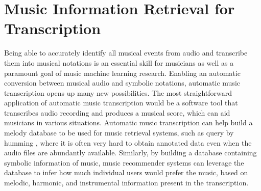 
\graphicspath{{2-mir/figures/}}

\chapter{Music Information Retrieval for Transcription}
\label{ch:mir}

Being able to accurately identify all musical events from audio and transcribe them into musical notations is an essential skill for musicians as well as a paramount goal of music machine learning research.
Enabling an automatic conversion between musical audio and symbolic notations, automatic music transcription opens up many new possibilities.
The most straightforward application of automatic music transcription would be a software tool that transcribes audio recording and produces a musical score, which can aid musicians in various situations.
Automatic music transcription can help build a melody database to be used for music retrieval systems, such as query by humming \cite{molina2014humming}, where it is often very hard to obtain annotated data even when the audio files are abundantly available.
Similarly, by building a database containing symbolic information of music, music recommender systems can leverage the database to infer how much individual users would prefer the music, based on melodic, harmonic, and instrumental information present in the transcription.


